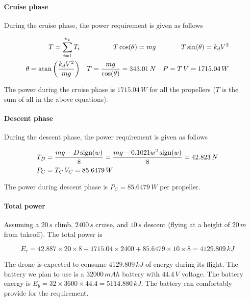 \paragraph*{Cruise phase}
During the cruise phase, the power requirement is given as follows

\begin{align*}
    T = \sum_{i=1}^{n_p} T_i &&
    T \cos(\theta) = mg && T \sin(\theta) = k_d V^2 \\
    \theta = \textup{atan}\left(\frac{k_d V^2}{mg}\right) &&
    T = \frac{mg}{\cos(\theta)} = 343.01\,N &&
    P = T\, V = 1715.04\,W
\end{align*}

The power during the cruise phase is $1715.04\,W$ for all the propellers ($T$ is the sum of all in the above equations).

\paragraph*{Descent phase}
During the descent phase, the power requirement is given as follows

\begin{align*}
    T_D &= \frac{mg - D\,\textup{sign}(w)}{8} = \frac{mg - 0.1021 w^2\,\textup{sign}(w)}{8} = 42.823\,N \\
    P_C &= T_C \, V_C = 85.6479 \, W
\end{align*}

The power during descent phase is $P_C = 85.6479 \, W$ per propeller.

\paragraph*{Total power}

Assuming a $20\,s$ climb, $2400\,s$ cruise, and $10\,s$ descent (flying at a height of $20\,m$ from takeoff). The total power is

\begin{equation*}
    E_r = 42.887 \times 20 \times 8 + 1715.04 \times 2400 + 85.6479 \times 10 \times 8 = 4129.809 \, kJ
\end{equation*}

The drone is expected to consume $4129.809 \, kJ$ of energy during its flight. The battery we plan to use is a $32000\,mAh$ battery with $44.4\,V$ voltage. The battery energy is $E_b = 32 \times 3600 \times 44.4 = 5114.880\,kJ$. The battery can comfortably provide for the requirement.

